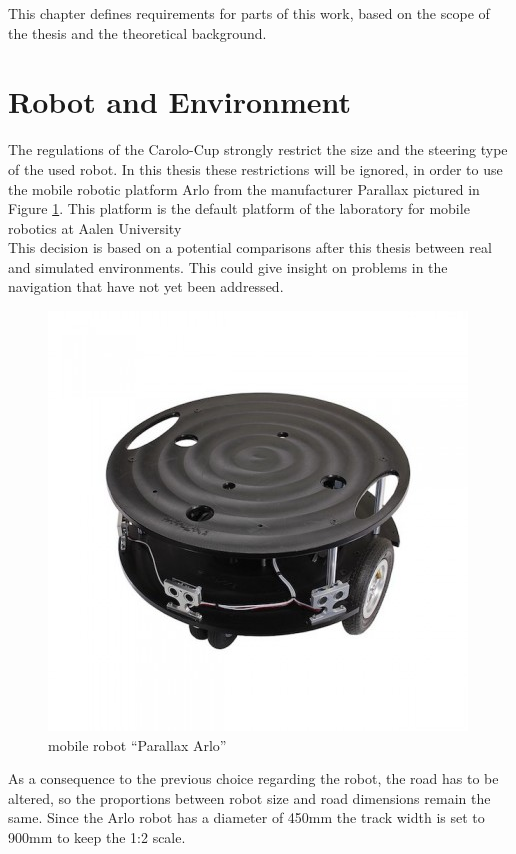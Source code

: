 This chapter defines requirements for parts of this work, based on the scope of the thesis and the theoretical background.

\section{Robot and Environment}

The regulations of the Carolo-Cup strongly restrict the size and the steering type of the used robot. In this thesis these restrictions will be ignored, in order to use the mobile robotic platform Arlo from the manufacturer Parallax pictured in Figure \ref{arlore}. This platform is the default platform of the laboratory for mobile robotics at Aalen University\\

This decision is based on a potential comparisons after this thesis between real and simulated environments. This could give insight on problems in the navigation that have not yet been addressed.\\


\begin{figure}[H]
	\centering
	\includegraphics[width=.7\textwidth]{arlo real}
	
	\caption{mobile robot ``Parallax Arlo'' \cite{arloreal}}
	\label{arlore}
\end{figure}

As a consequence to the previous choice regarding the robot, the road has to be altered, so the proportions between robot size and road dimensions remain the same. Since the Arlo robot has a diameter of 450mm the track width is set to 900mm to keep the 1:2 scale.

